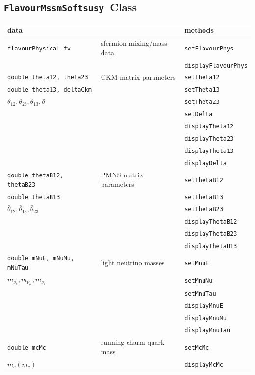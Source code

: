 \documentclass{article}
\def\code#1{\small{\tt #1}\normalsize}
\begin{document}
\subsection{\code{FlavourMssmSoftsusy}~Class \label{sec:flavour}}
\begin{table}\begin{center}\begin{tabular}{lll} 
data & & methods \\ \hline
\code{flavourPhysical fv}&sfermion mixing/mass data & \code{setFlavourPhys} \\
                        &                           &\code{displayFlavourPhys}\\ 
\hline
\code{double theta12, theta23} & CKM matrix parameters &
\code{setTheta12} \\
\code{double theta13, deltaCkm} & & \code{setTheta13} \\
$\theta_{12}, \theta_{23}, \theta_{13}, \delta$ & & \code{setTheta23} \\
 & & \code{setDelta} \\
 & & \code{displayTheta12} \\
 & & \code{displayTheta23} \\
 & & \code{displayTheta13} \\
 & & \code{displayDelta} \\
\hline
\code{double thetaB12, thetaB23} & PMNS matrix parameters &
\code{setThetaB12} \\
\code{double thetaB13} & & \code{setThetaB13} \\
${\bar \theta}_{12},{\bar \theta}_{13},{\bar \theta}_{23}$ & &
\code{setThetaB23} \\ 
 & & \code{displayThetaB12} \\
 & & \code{displayThetaB23} \\
 & & \code{displayThetaB13} \\
\hline
\code{double mNuE, mNuMu, mNuTau} & light neutrino masses& \code{setMnuE}\\
$m_{\nu_e}, m_{\nu_\mu}, m_{\nu_\tau}$ & & \code{setMnuNu} \\
 & & \code{setMnuTau} \\
 & & \code{displayMnuE} \\
 & & \code{displayMnuMu} \\
 & & \code{displayMnuTau} \\ \hline
\code{double mcMc} & running charm quark mass & \code{setMcMc} \\
$m_c(m_c)$ & & \code{displayMcMc} \\

\end{tabular}
\end{center}
\end{table}
\end{document}
